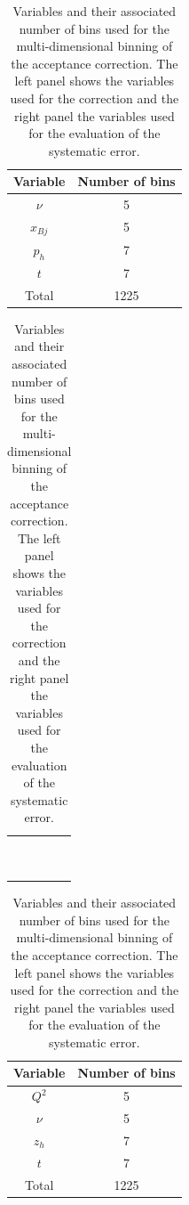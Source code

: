 \begin{table}[htbp]
  \centering
  \begin{tabular}{@{} cc @{}}
    \hline
    Variable & Number of bins \\ 
    \hline
    $\nu$    & 5 \\
    $x_{Bj}$ & 5 \\
    $p_h$    & 7 \\
    $t$      & 7 \\
    \hline
    Total    & 1225 \\
    \hline
  \end{tabular}
  \begin{tabular}{@{} c @{}}
  ~~~~~~\\
  ~~~~~~\\
  \end{tabular}
  \begin{tabular}{@{} cc @{}}
    \hline
    Variable & Number of bins \\ 
    \hline
    $Q^2$    & 5 \\
    $\nu$    & 5 \\
    $z_h$    & 7 \\
    $t$      & 7 \\
    \hline
    Total    & 1225 \\
    \hline
  \end{tabular}
  \caption{Variables and their associated number of bins used for the 
   multi-dimensional binning of the acceptance correction. The left panel 
   shows the variables used for the correction and the right panel the 
   variables used for the evaluation of the systematic error.}
  \label{tab:AcceptBinning}
\end{table}

